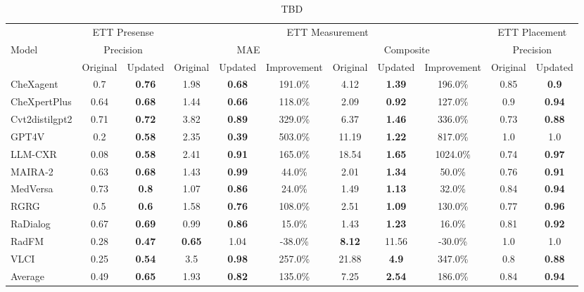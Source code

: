 \begin{table*}[htbp]
\centering
\small
\caption{TBD}
\begin{tabular}{lcccccccccc}
\toprule
& \multicolumn{2}{c}{ETT Presense} & \multicolumn{6}{c}{ETT Measurement} & \multicolumn{2}{c}{ETT Placement} \\
\cmidrule(lr){2-3} \cmidrule(lr){4-9} \cmidrule(lr){10-11}
Model & \multicolumn{2}{c}{Precision} & \multicolumn{3}{c}{MAE} & \multicolumn{3}{c}{Composite} & \multicolumn{2}{c}{Precision} \\
\cmidrule(lr){2-3} \cmidrule(lr){4-6} \cmidrule(lr){7-9} \cmidrule(lr){10-11}
 & Original & Updated & Original & Updated & Improvement & Original & Updated & Improvement & Original & Updated \\
\midrule
CheXagent & 0.7 & \textbf{0.76} & 1.98 & \textbf{0.68} & 191.0\% & 4.12 & \textbf{1.39} & 196.0\% & 0.85 & \textbf{0.9} \\
CheXpertPlus & 0.64 & \textbf{0.68} & 1.44 & \textbf{0.66} & 118.0\% & 2.09 & \textbf{0.92} & 127.0\% & 0.9 & \textbf{0.94} \\
Cvt2distilgpt2 & 0.71 & \textbf{0.72} & 3.82 & \textbf{0.89} & 329.0\% & 6.37 & \textbf{1.46} & 336.0\% & 0.73 & \textbf{0.88} \\
GPT4V & 0.2 & \textbf{0.58} & 2.35 & \textbf{0.39} & 503.0\% & 11.19 & \textbf{1.22} & 817.0\% & 1.0 & 1.0 \\
LLM-CXR & 0.08 & \textbf{0.58} & 2.41 & \textbf{0.91} & 165.0\% & 18.54 & \textbf{1.65} & 1024.0\% & 0.74 & \textbf{0.97} \\
MAIRA-2 & 0.63 & \textbf{0.68} & 1.43 & \textbf{0.99} & 44.0\% & 2.01 & \textbf{1.34} & 50.0\% & 0.76 & \textbf{0.91} \\
MedVersa & 0.73 & \textbf{0.8} & 1.07 & \textbf{0.86} & 24.0\% & 1.49 & \textbf{1.13} & 32.0\% & 0.84 & \textbf{0.94} \\
RGRG & 0.5 & \textbf{0.6} & 1.58 & \textbf{0.76} & 108.0\% & 2.51 & \textbf{1.09} & 130.0\% & 0.77 & \textbf{0.96} \\
RaDialog & 0.67 & \textbf{0.69} & 0.99 & \textbf{0.86} & 15.0\% & 1.43 & \textbf{1.23} & 16.0\% & 0.81 & \textbf{0.92} \\
RadFM & 0.28 & \textbf{0.47} & \textbf{0.65} & 1.04 & -38.0\% & \textbf{8.12} & 11.56 & -30.0\% & 1.0 & 1.0 \\
VLCI & 0.25 & \textbf{0.54} & 3.5 & \textbf{0.98} & 257.0\% & 21.88 & \textbf{4.9} & 347.0\% & 0.8 & \textbf{0.88} \\
\midrule
Average & 0.49 & \textbf{0.65} & 1.93 & \textbf{0.82} & 135.0\% & 7.25 & \textbf{2.54} & 186.0\% & 0.84 & \textbf{0.94} \\
\bottomrule
\end{tabular}
\label{tab:ett_presence_comparison}
\end{table*}